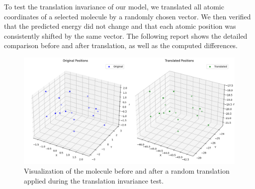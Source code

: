 \documentclass{article}
\begin{document}
To test the translation invariance of our model, we translated all atomic coordinates of a selected molecule by a randomly chosen vector. We then verified that the predicted energy did not change and that each atomic position was consistently shifted by the same vector. The following report shows the detailed comparison before and after translation, as well as the computed differences.
\begin{figure}[H]
  \centering
  \includegraphics[width=0.9\linewidth]{Images_Ayoub/Invariance/Transformers/Translation.png}
  \caption{Visualization of the molecule before and after a random translation applied during the translation invariance test.}
  \label{fig:translation_invariance_visualization}
\end{figure}
\end{document}
